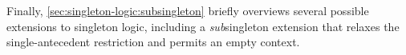 Finally, \cref{sec:singleton-logic:subsingleton} briefly overviews several possible extensions to singleton logic, including a \emph{sub}\-singleton extension that relaxes the single-antecedent restriction and permits an empty context.







